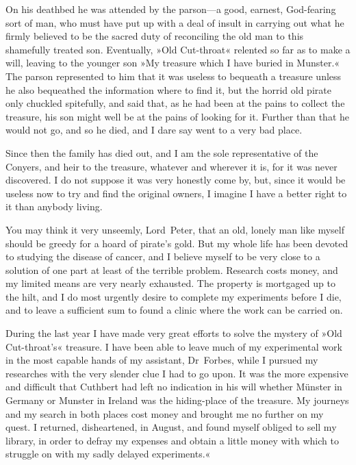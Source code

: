 On his deathbed he was attended by the parson—a good, earnest, God-fearing sort of man, who must have put up with a deal of insult in carrying out what he firmly believed to be the sacred duty of reconciling the old man to this shamefully treated son. Eventually, »Old Cut-throat« relented so far as to make a will, leaving to the younger son »My treasure which I have buried in Munster.« The parson represented to him that it was useless to bequeath a treasure unless he also bequeathed the information where to find it, but the horrid old pirate only chuckled spitefully, and said that, as he had been at the pains to collect the treasure, his son might well be at the pains of looking for it. Further than that he would not go, and so he died, and I dare say went to a very bad place.

Since then the family has died out, and I am the sole representative of the Conyers, and heir to the treasure, whatever and wherever it is, for it was never discovered. I do not suppose it was very honestly come by, but, since it would be useless now to try and find the original owners, I imagine I have a better right to it than anybody living.

You may think it very unseemly, Lord~Peter, that an old, lonely man like myself should be greedy for a hoard of pirate's gold. But my whole life has been devoted to studying the disease of cancer, and I believe myself to be very close to a solution of one part at least of the terrible problem. Research costs money, and my limited means are very nearly exhausted. The property is mortgaged up to the hilt, and I do most urgently desire to complete my experiments before I die, and to leave a sufficient sum to found a clinic where the work can be carried on.

During the last year I have made very great efforts to solve the mystery of »Old Cut-throat's« treasure. I have been able to leave much of my experimental work in the most capable hands of my assistant, Dr~Forbes, while I pursued my researches with the very slender clue I had to go upon. It was the more expensive and difficult that Cuthbert had left no indication in his will whether Münster in Germany or Munster in Ireland was the hiding-place of the treasure. My journeys and my search in both places cost money and brought me no further on my quest. I returned, disheartened, in August, and found myself obliged to sell my library, in order to defray my expenses and obtain a little money with which to struggle on with my sadly delayed experiments.«


